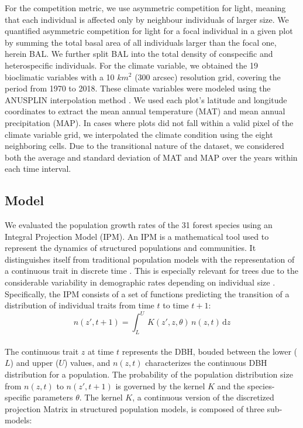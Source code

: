 For the competition metric, we use asymmetric competition for light,
meaning that each individual is affected only by neighbour individuals
of larger size. We quantified asymmetric competition for light for a
focal individual in a given plot by summing the total basal area of all
individuals larger than the focal one, herein BAL. We further split BAL
into the total density of conspecific and heterospecific individuals.
For the climate variable, we obtained the 19 bioclimatic variables with
a 10 \(km^2\) (300 arcsec) resolution grid, covering the period from
1970 to 2018. These climate variables were modeled using the ANUSPLIN
interpolation method \citep{McKenney2011}. We used each plot's latitude
and longitude coordinates to extract the mean annual temperature (MAT)
and mean annual precipitation (MAP). In cases where plots did not fall
within a valid pixel of the climate variable grid, we interpolated the
climate condition using the eight neighboring cells. Due to the
transitional nature of the dataset, we considered both the average and
standard deviation of MAT and MAP over the years within each time
interval.\\

\hypertarget{model}{%
\subsection{Model}\label{model}}

We evaluated the population growth rates of the 31 forest species using
an Integral Projection Model (IPM). An IPM is a mathematical tool used
to represent the dynamics of structured populations and communities. It
distinguishes itself from traditional population models with the
representation of a continuous trait in discrete time
\citep{Easterling2000}. This is especially relevant for trees due to the
considerable variability in demographic rates depending on individual
size \citep{kohyama1992}. Specifically, the IPM consists of a set of
functions predicting the transition of a distribution of individual
traits from time \(t\) to time \(t+1\):\\

\begin{equation}
n(z', t + 1) = \int_{L}^{U} \, K(z', z, \theta)\, n(z, t)\, \mathrm{d}z
\label{eq:ipm}\end{equation}\\

The continuous trait \(z\) at time \(t\) represents the DBH, bouded
between the lower (\(L\)) and upper (\(U\)) values, and \(n(z, t)\)
characterizes the continuous DBH distribution for a population. The
probability of the population distribution size from \(n(z, t)\) to
\(n(z', t+1)\) is governed by the kernel \(K\) and the species-specific
parameters \(\theta\). The kernel \(K\), a continuous version of the
discretized projection Matrix in structured population models, is
composed of three sub-models:\\

